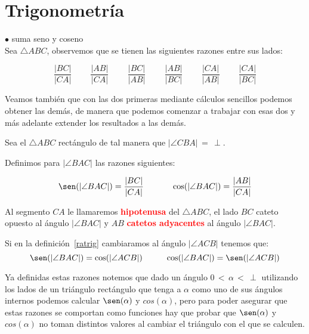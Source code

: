      
\section{Trigonometría}
$\bullet$ suma seno y coseno\\

Sea $\triangle ABC$, observemos que se tienen las siguientes razones entre sus lados:


$$\frac{|BC|}{|CA|}\;\;\;\;\;\;\;\;\frac{|AB|}{|CA|}\;\;\;\;\;\;\;\;\frac{|BC|}{|AB|}\;\;\;\;\;\;\;\;\frac{|AB|}{|BC|}\;\;\;\;\;\;\;\;\frac{|CA|}{|AB|}\;\;\;\;\;\;\;\;\frac{|CA|}{|BC|}$$

Veamos también que con las dos primeras mediante cálculos sencillos podemos obtener las demás, de manera que podemos comenzar a trabajar con esas dos y más adelante extender los resultados a las demás. 

\begin{df}\label{ratrig}
Sea el $\triangle ABC$ rectángulo de tal manera que $|\angle CBA|\,=\,\perp$.

Definimos para $|\angle BAC|$  las razones siguientes:
     

$$\sen (|\angle BAC|)= \frac{|BC|}{|CA|}\;\;\;\;\;\;\;\;\;\;\;\; \cos (|\angle BAC|)= \frac{|AB|}{|CA|}$$

Al segmento $CA$ le llamaremos \textcolor{red}{\bf hipotenusa} del $\triangle ABC$, el lado $BC$ cateto opuesto al ángulo $|\angle BAC|$ y $AB$ \textcolor{red}{\bf catetos adyacentes} al ángulo $|\angle BAC|$.
\end{df}

\begin{obs}\label{sencos}
Si en la definición~\ref{ratrig} cambiaramos al ángulo $|\angle ACB|$ tenemos que:
$$\sen (|\angle BAC|)= \cos(|\angle ACB|)\;\;\;\;\;\;\;\;\;\;\cos(|\angle BAC|)=\sen(|\angle ACB|)$$ 
\end{obs}


Ya definidas estas razones notemos que dado un ángulo $0\,<\,\alpha\,<\,\perp$  utilizando los lados de un triángulo rectángulo que tenga a $\alpha$ como uno de sus ángulos internos podemos calcular $\sen(\alpha)$ y $cos(\alpha)$, pero para poder asegurar que estas razones se comportan como funciones hay que probar que $\sen(\alpha)$ y $cos(\alpha)$ no toman distintos valores al cambiar el triángulo con el que se calculen.

